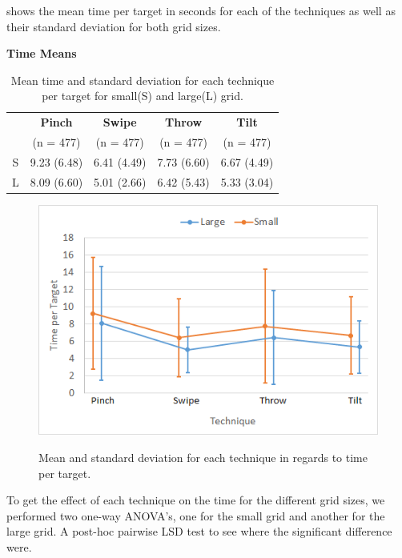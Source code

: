  shows the mean time per target in seconds for each of the techniques as well as their standard deviation for both grid sizes. 
\begin{table}[H]
	\centering
	\textbf{Time Means}\\[4pt]
	\begin{adjustbox}{width=\columnwidth}
	\begin{tabular}{|c|c|c|c|c|}
		\hline
		\rowcolor[HTML]{9B9B9B} 
		 & \textbf{Pinch} & \textbf{Swipe} & \textbf{Throw} & \textbf{Tilt} \\ 
		 \rowcolor[HTML]{9B9B9B} 
		 & (n = 477) & (n = 477) & (n = 477) & (n = 477) \\ \hline
		S & 9.23 (6.48)          & 6.41  (4.49)         & 7.73 (6.60)          & 6.67 (4.49)  \\ \hline
		L & 8.09 (6.60)          & 5.01  (2.66)          & 6.42 (5.43)          & 5.33 (3.04) \\ \hline
	\end{tabular}
	\end{adjustbox}
	\caption{Mean time and standard deviation for each technique per target for small(S) and large(L) grid.}
	\label{tab:meanTimesTechnique}
\end{table}

\begin{figure}[H]
	{\includegraphics[width = 1\columnwidth ]{images/time.png}} 
	\caption{
		Mean and standard deviation for each technique in regards to time per target.
	}
	\label{fig:timeResults}
\end{figure}

To get the effect of each technique on the time for the different grid sizes, we performed two one-way ANOVA's, one for the small grid and another for the large grid.
A post-hoc pairwise LSD test to see where the significant difference were.

